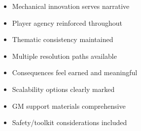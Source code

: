 \documentclass[11pt]{article}
\begin{document}
\begin{itemize}
  \item[$\square$] Mechanical innovation serves narrative
  \item[$\square$] Player agency reinforced throughout
  \item[$\square$] Thematic consistency maintained
  \item[$\square$] Multiple resolution paths available
  \item[$\square$] Consequences feel earned and meaningful
  \item[$\square$] Scalability options clearly marked
  \item[$\square$] GM support materials comprehensive
  \item[$\square$] Safety/toolkit considerations included
\end{itemize}


\end{document}
